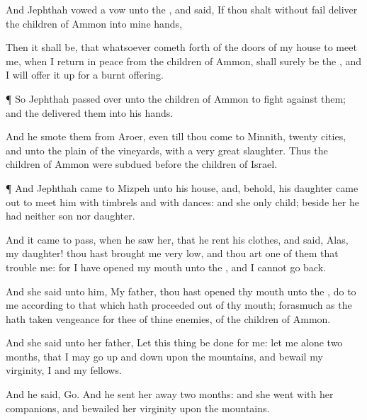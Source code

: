 {And
Jephthah
vowed a
vow unto the
{}, and
said, If thou shalt without
fail
deliver the
children of
Ammon into mine
hands,

Then it shall be, that
whatsoever cometh
forth of the
doors of my
house to
meet me, when I
return in
peace from the
children of
Ammon, shall surely be the
{}, and I will offer it
up for a burnt
offering.


\par }{\PP {}¶ So
Jephthah passed
over unto the
children of
Ammon to
fight against them; and the
{}
delivered them into his
hands.

And he
smote them from
Aroer, even till thou
come to
Minnith,
{}
twenty
cities, and unto the
plain of the
vineyards, with a
very
great
slaughter. Thus the
children of
Ammon were
subdued
before the
children of
Israel.


\par }{\PP {}¶ And
Jephthah
came to
Mizpeh unto his
house, and, behold, his
daughter came
out to
meet him with
timbrels and with
dances: and she
{} only
child; beside her he had neither
son
nor
daughter.

And it came to pass, when he
saw her, that he
rent his
clothes, and
said,
Alas, my
daughter! thou hast
brought me
very
low, and thou art one of them that
trouble me: for I have
opened my
mouth unto the
{}, and I
cannot go
back.

And she
said unto him, My
father,
{} thou hast
opened thy
mouth unto the
{},
do to me according to that
which hath
proceeded out of thy
mouth;
forasmuch as the
{} hath
taken
vengeance for thee of thine
enemies,
{} of the
children of
Ammon.

And she
said unto her
father, Let this
thing be
done for me: let me
alone
two
months, that I may go
up and
down upon the
mountains, and
bewail my
virginity, I and my
fellows.

And he
said,
Go. And he sent her
away
{}
two
months: and she
went with her
companions, and
bewailed her
virginity upon the
mountains.

}

